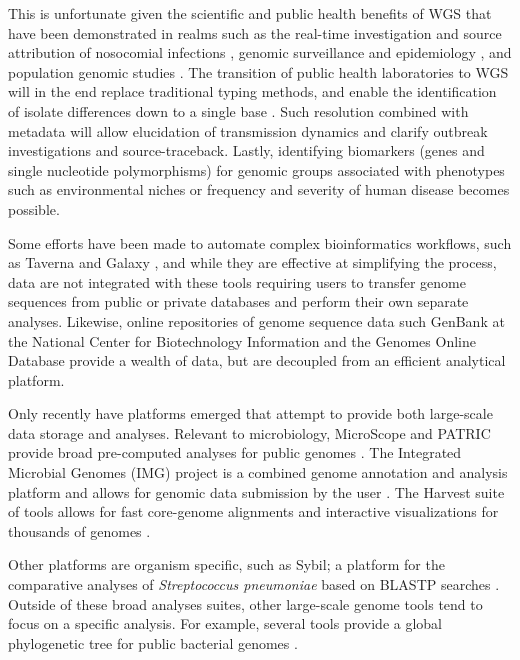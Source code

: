 \documentclass[doublespacing, linenumbers]{bmcart}
\begin{document}
This is unfortunate given the scientific and public health benefits of WGS that have been demonstrated in realms such as  the real-time investigation and source attribution of nosocomial infections \cite{halachev_genomic_2014, harris_whole-genome_2013,graham_real-time_2014}, genomic surveillance and epidemiology \cite{cody_real-time_2013}, and population genomic studies \cite{nasser_evolutionary_2014,kopac_genomic_2014}. The transition of public health laboratories to WGS will in the end replace traditional typing methods, and enable the identification of isolate differences down to a single base \cite{grad_epidemiologic_2014}. Such resolution combined with metadata will allow elucidation of transmission dynamics and clarify outbreak investigations and source-traceback. Lastly, identifying biomarkers (genes and single nucleotide polymorphisms) for genomic groups associated with phenotypes such as environmental niches or frequency and severity of human disease becomes possible.

Some efforts have been made to automate complex bioinformatics workflows, such as Taverna \cite{lanzen_taverna_2008} and Galaxy \cite{goecks_galaxy:_2010}, and while they are effective at simplifying the process, data are not integrated with these tools requiring users to transfer genome sequences from public or private databases and perform their own separate analyses. Likewise, online repositories of genome sequence data such GenBank at the National Center for Biotechnology Information \cite{benson_genbank_2012} and the Genomes Online Database \cite{pagani_genomes_2012} provide a wealth of data, but are decoupled from an efficient analytical platform.

Only recently have platforms emerged that attempt to provide both large-scale data storage and analyses. Relevant to microbiology, MicroScope and PATRIC provide broad pre-computed analyses for public genomes  \cite{vallenet_microscope--integrated_2012,wattam_patric_2013}. The Integrated Microbial Genomes (IMG) project is a combined genome annotation and analysis platform and allows for genomic data submission by the user \cite{markowitz_img_2013}. The Harvest suite of tools allows for fast core-genome alignments and interactive visualizations for thousands of genomes \cite{treangen_rapid_2014}.

Other platforms are organism specific, such as Sybil; a platform for the comparative analyses of \textit{Streptococcus pneumoniae} based on BLASTP searches \cite{riley_using_2012}. Outside of these broad analyses suites, other large-scale genome tools tend to focus on a specific analysis. For example, several tools provide a global phylogenetic tree for public bacterial genomes \cite{letunic_interactive_2011,fang_daily-updated_2013,federhen_ncbi_2011}.  
\end{document}
